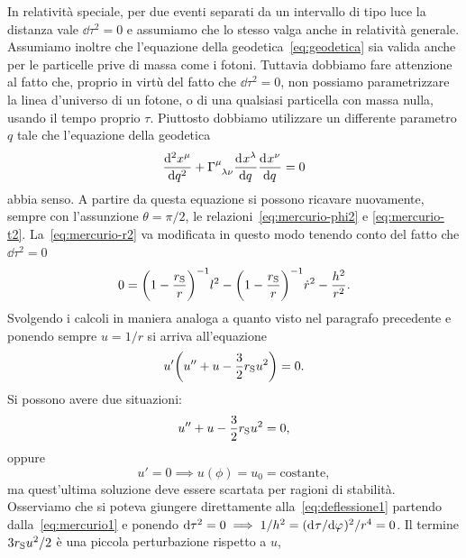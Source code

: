 In relatività speciale, per due eventi separati da un intervallo di tipo luce la
distanza vale $\dd\tau^{2} = 0$ e assumiamo che lo stesso valga anche in
relatività generale.  Assumiamo inoltre che l'equazione della
geodetica~\eqref{eq:geodetica} sia valida anche per le particelle prive di massa
come i fotoni.  Tuttavia dobbiamo fare attenzione al fatto che, proprio in virtù
del fatto che $\dd\tau^{2} = 0$, non possiamo parametrizzare la linea d'universo
di un fotone, o di una qualsiasi particella con massa nulla, usando il tempo
proprio $\tau$.  Piuttosto dobbiamo utilizzare un differente parametro $q$ tale
che l'equazione della geodetica
\begin{equation}
  \toder[2]{x^{\mu}}{q} + \tensor{\Gamma}{^{\mu}_{\lambda\nu}}
  \toder{x^{\lambda}}{q} \toder{x^{\nu}}{q} = 0
\end{equation}
abbia senso.  A partire da questa equazione si possono ricavare nuovamente,
sempre con l'assunzione $\theta = \pi/2$, le relazioni~\eqref{eq:mercurio-phi2}
e \eqref{eq:mercurio-t2}.  La~\eqref{eq:mercurio-r2} va modificata in questo
modo tenendo conto del fatto che $\dd\tau^{2} = 0$
\begin{equation}
  0 = \bigg(1 - \frac{r_{\textup{S}}}{r}\bigg)^{-1}l^{2} - \bigg(1 -
  \frac{r_{\textup{S}}}{r}\bigg)^{-1}\dot{r}^{2} - \frac{h^{2}}{r^{2}}.
\end{equation}
Svolgendo i calcoli in maniera analoga a quanto visto nel paragrafo precedente e
ponendo sempre $u = 1/r$ si arriva all'equazione
\begin{equation}
  u'\bigg(u'' + u - \frac{3}{2}r_{\textup{S}}u^{2}\bigg) = 0.
\end{equation}
Si possono avere due situazioni:
\begin{equation}
  \label{eq:deflessione1}
  u'' + u - \frac{3}{2}r_{\textup{S}}u^{2} = 0,
\end{equation}
oppure
\begin{equation}
  u' = 0 \implies u(\phi) = u_{0} = \text{costante},
\end{equation}
ma quest'ultima soluzione deve essere scartata per ragioni di stabilità.
Osserviamo che si poteva giungere direttamente alla~\eqref{eq:deflessione1}
partendo dalla~\eqref{eq:mercurio1} e ponendo
$\mathop{}\!\mathrm{d}\tau^{2} = 0 \implies 1/h^{2} = (\mathrm{d}^{}\tau / \mathrm{d} {\varphi}^{})^{2}/r^{4} = 0$.  Il
termine $3r_{\textup{S}}u^{2}/2$ è una piccola perturbazione rispetto a $u$,
